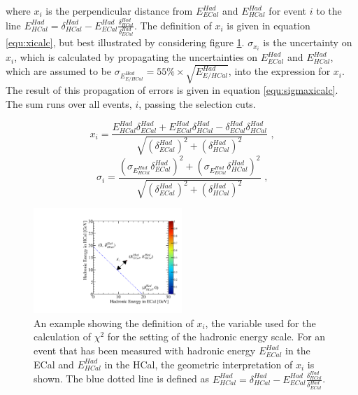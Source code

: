 \noindent where $x_{i}$ is the perpendicular distance from $E^{Had}_{ECal}$ and $E^{Had}_{HCal}$ for event $i$ to the line $E^{Had}_{HCal} = \delta^{Had}_{HCal} - E^{Had}_{ECal} \frac{\delta^{Had}_{HCal}}{\delta^{Had}_{ECal}}$.   The definition of $x_{i}$ is given in equation \ref{equ:xicalc}, but best illustrated by considering figure \ref{fig:hadscalechi2calc}.  $\sigma_{x_{i}}$ is the uncertainty on $x_{i}$, which is calculated by propagating the uncertainties on $E^{Had}_{ECal}$ and $E^{Had}_{HCal}$, which are assumed to be $\sigma_{E^{Had}_{E/HCal}} = 55\% \times \sqrt{E^{Had}_{E/HCal}}$, into the expression for $x_{i}$.  The result of this propagation of errors is given in equation \ref{equ:sigmaxicalc}.  The sum runs over all events, $i$, passing the selection cuts.  

\begin{equation}
x_{i} = \frac{E^{Had}_{HCal} \delta^{Had}_{ECal} + E^{Had}_{ECal} \delta^{Had}_{HCal} - \delta^{Had}_{ECal} \delta^{Had}_{HCal}}{\sqrt{(\delta^{Had}_{ECal})^{2} + (\delta^{Had}_{HCal})^{2}}}\text{ ,}
\label{equ:xicalc}
\end{equation}
\begin{equation}
\sigma_{i} = \frac{(\sigma_{E^{Had}_{HCal}}  \delta^{Had}_{ECal})^{2} + (\sigma_{E^{Had}_{ECal}} \delta^{Had}_{HCal})^{2}}{\sqrt{(\delta^{Had}_{ECal})^{2} + (\delta^{Had}_{HCal})^{2}}}\text{ ,}
\label{equ:sigmaxicalc}
\end{equation}

\begin{figure}[h!]
\includegraphics[width=0.5\textwidth]{EnergyEstimators/Plots/Calibration/HadScaleSetting/HadScaleECalHCalSelectionExample.pdf}
\caption[An example showing the definition of $x_{i}$, the variable used for the calculation of $\chi^{2}(\delta^{Had}_{ECal}, \delta^{Had}_{HCal})$ for the setting of the hadronic energy scale.]{An example showing the definition of $x_{i}$, the variable used for the calculation of $\chi^{2}$ for the setting of the hadronic energy scale.  For an event that has been measured with hadronic energy $E^{Had}_{ECal}$ in the ECal and $E^{Had}_{HCal}$ in the HCal, the geometric interpretation of $x_{i}$ is shown.  The blue dotted line is defined as $E^{Had}_{HCal} = \delta^{Had}_{HCal} - E^{Had}_{ECal} \frac{\delta^{Had}_{HCal}}{\delta^{Had}_{ECal}}$.}
\label{fig:hadscalechi2calc}
\end{figure}

